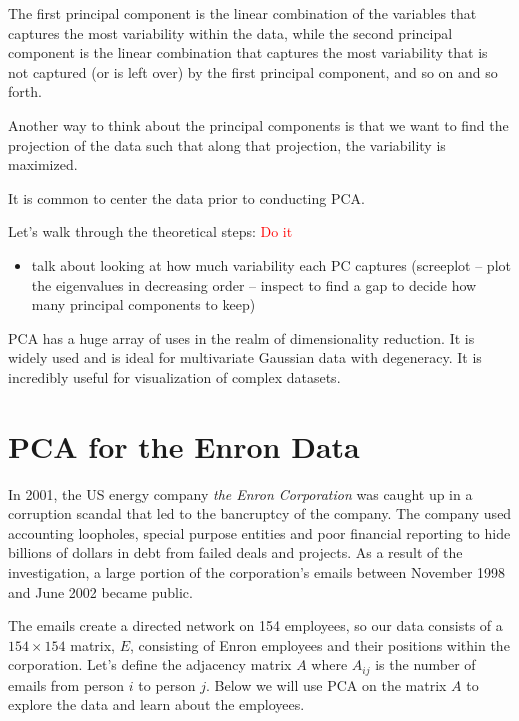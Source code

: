 The first principal component is the linear combination of the variables that captures the most variability within the data, while the second principal component is the linear combination that captures the most variability that is not captured (or is left over) by the first principal component, and so on and so forth. 

Another way to think about the principal components is that we want to find the projection of the data such that along that projection, the variability is maximized. 

It is common to center the data prior to conducting PCA. 

Let's walk through the theoretical steps: \textcolor{red}{Do it}

\begin{itemize}
\item talk about looking at how much variability each PC captures (screeplot -- plot the eigenvalues in decreasing order -- inspect to find a gap to decide how many principal components to keep)
\end{itemize}



PCA has a huge array of uses in the realm of dimensionality reduction. It is widely used and is ideal for multivariate Gaussian data with degeneracy. It is incredibly useful for visualization of complex datasets. 



\section{PCA for the Enron Data}

In 2001, the US energy company \emph{the Enron Corporation} was caught up in a corruption scandal that led to the bancruptcy of the company. The company used accounting loopholes, special purpose entities and poor financial reporting to hide billions of dollars in debt from failed deals and projects. As a result of the investigation, a large portion of the corporation's emails between November 1998 and June 2002 became public. 

The emails create a directed network on 154 employees, so our data consists of a $154 \times 154$ matrix, $E$, consisting of Enron employees and their positions within the corporation. Let's define the adjacency matrix $A$ where $A_{ij}$ is the number of emails from person $i$ to person $j$. Below we will use PCA on the matrix $A$ to explore the data and learn about the employees.

